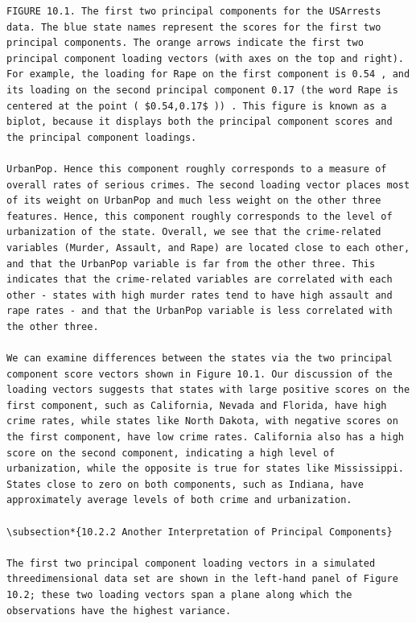 \documentclass[10pt]{article}
\begin{document}
\begin{verbatim}
FIGURE 10.1. The first two principal components for the USArrests data. The blue state names represent the scores for the first two principal components. The orange arrows indicate the first two principal component loading vectors (with axes on the top and right). For example, the loading for Rape on the first component is 0.54 , and its loading on the second principal component 0.17 (the word Rape is centered at the point ( $0.54,0.17$ )) . This figure is known as a biplot, because it displays both the principal component scores and the principal component loadings.

UrbanPop. Hence this component roughly corresponds to a measure of overall rates of serious crimes. The second loading vector places most of its weight on UrbanPop and much less weight on the other three features. Hence, this component roughly corresponds to the level of urbanization of the state. Overall, we see that the crime-related variables (Murder, Assault, and Rape) are located close to each other, and that the UrbanPop variable is far from the other three. This indicates that the crime-related variables are correlated with each other - states with high murder rates tend to have high assault and rape rates - and that the UrbanPop variable is less correlated with the other three.

We can examine differences between the states via the two principal component score vectors shown in Figure 10.1. Our discussion of the loading vectors suggests that states with large positive scores on the first component, such as California, Nevada and Florida, have high crime rates, while states like North Dakota, with negative scores on the first component, have low crime rates. California also has a high score on the second component, indicating a high level of urbanization, while the opposite is true for states like Mississippi. States close to zero on both components, such as Indiana, have approximately average levels of both crime and urbanization.

\subsection*{10.2.2 Another Interpretation of Principal Components}

The first two principal component loading vectors in a simulated threedimensional data set are shown in the left-hand panel of Figure 10.2; these two loading vectors span a plane along which the observations have the highest variance.


\end{verbatim}
\end{document}
